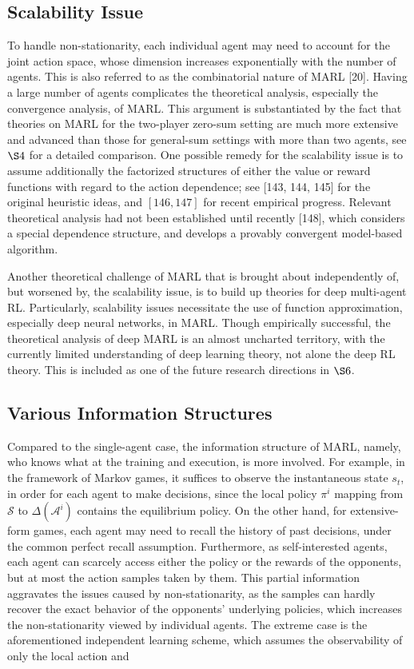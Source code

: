 \documentclass[10pt]{article}
\begin{document}
\subsection{Scalability Issue}
To handle non-stationarity, each individual agent may need to account for the joint action space, whose dimension increases exponentially with the number of agents. This is also referred to as the combinatorial nature of MARL [20]. Having a large number of agents complicates the theoretical analysis, especially the convergence analysis, of MARL. This argument is substantiated by the fact that theories on MARL for the two-player zero-sum setting are much more extensive and advanced than those for general-sum settings with more than two agents, see $\S 4$ for a detailed comparison. One possible remedy for the scalability issue is to assume additionally the factorized structures of either the value or reward functions with regard to the action dependence; see [143, 144, 145] for the original heuristic ideas, and $[146,147]$ for recent empirical progress. Relevant theoretical analysis had not been established until recently [148], which considers a special dependence structure, and develops a provably convergent model-based algorithm.

Another theoretical challenge of MARL that is brought about independently of, but worsened by, the scalability issue, is to build up theories for deep multi-agent RL. Particularly, scalability issues necessitate the use of function approximation, especially deep neural networks, in MARL. Though empirically successful, the theoretical analysis of deep MARL is an almost uncharted territory, with the currently limited understanding of deep learning theory, not alone the deep RL theory. This is included as one of the future research directions in $\S 6$.

\subsection{Various Information Structures}
Compared to the single-agent case, the information structure of MARL, namely, who knows what at the training and execution, is more involved. For example, in the framework of Markov games, it suffices to observe the instantaneous state $s_{t}$, in order for each agent to make decisions, since the local policy $\pi^{i}$ mapping from $\mathcal{S}$ to $\Delta\left(\mathcal{A}^{i}\right)$ contains the equilibrium policy. On the other hand, for extensive-form games, each agent may need to recall the history of past decisions, under the common perfect recall assumption. Furthermore, as self-interested agents, each agent can scarcely access either the policy or the rewards of the opponents, but at most the action samples taken by them. This partial information aggravates the issues caused by non-stationarity, as the samples can hardly recover the exact behavior of the opponents' underlying policies, which increases the non-stationarity viewed by individual agents. The extreme case is the aforementioned independent learning scheme, which assumes the observability of only the local action and
\end{document}
